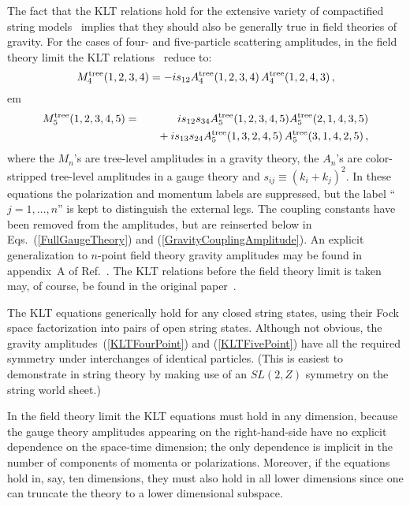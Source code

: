 \documentclass[12pt]{livrev}
\begin{document}
The fact that the KLT relations hold for the extensive
variety of compactified string models~\cite{Narain86,Narain87,
Dixon85,Dixon86,Kawai87,Antoniadis87} implies that they should
also be generally true in field theories of gravity.
For the cases of four- and five-particle scattering amplitudes, in the
field theory limit the KLT relations~\cite{KLT} reduce to:
%
\begin{equation}
M_4^{\rm tree}  (1,2,3,4) = 
 - i s_{12} A_4^{\rm tree} (1,2,3,4) \, A_4^{\rm tree}(1,2,4,3)\,,
\label{KLTFourPoint}
\end{equation}
%
%
 em
\begin{eqnarray}
M_5^{\rm tree}(1,2,3,4,5) & = &
i s_{12} s_{34}  A_5^{\rm tree}(1,2,3,4,5)
                                 A_5^{\rm tree}(2,1,4,3,5) \nonumber\\
&& \hskip .3 cm \null
 + i s_{13}s_{24} A_5^{\rm tree}(1,3,2,4,5) \, A_5^{\rm tree}(3,1,4,2,5)\,,
\label{KLTFivePoint}
\end{eqnarray}
%
where the $M_n$'s are tree-level amplitudes in a gravity theory, the
$A_n$'s are color-stripped tree-level amplitudes in a gauge theory and
$s_{ij}\equiv (k_i+k_j)^2$. In these equations the polarization and
momentum labels are suppressed, but the label ``$j= 1,\ldots, n$'' is
kept to distinguish the external legs.  The coupling constants have
been removed from the amplitudes, but are reinserted below in
Eqs.~(\ref{FullGaugeTheory}) and (\ref{GravityCouplingAmplitude}).  An
explicit generalization to $n$-point field theory gravity amplitudes
may be found in appendix~A of Ref.~\cite{MHVGrav}.  The KLT relations
before the field theory limit is taken may, of course, be found in the
original paper~\cite{KLT}.

The KLT equations generically hold for any closed string states, using
their Fock space factorization into pairs of open string states.
Although not obvious, the gravity amplitudes~(\ref{KLTFourPoint}) and
(\ref{KLTFivePoint}) have all the required symmetry under interchanges
of identical particles.  (This is easiest to demonstrate in string
theory by making use of an $SL(2,Z)$ symmetry on the string world
sheet.)  

In the field theory limit the KLT equations must hold in any
dimension, because the gauge theory amplitudes appearing on the
right-hand-side have no explicit dependence on the space-time
dimension; the only dependence is implicit in the number of components
of momenta or polarizations.  Moreover, if the equations hold in, say,
ten dimensions, they must also hold in all lower dimensions since one
can truncate the theory to a lower dimensional subspace.
\end{document}
